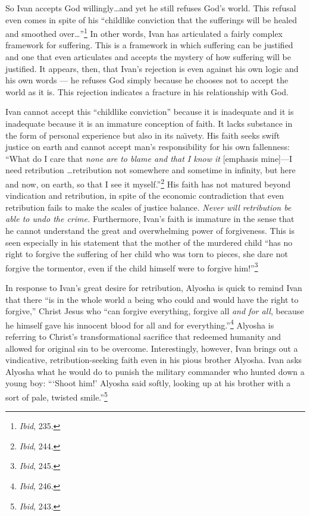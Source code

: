So Ivan accepts God willingly\ldots and yet he still refuses God's world. This refusal even comes in spite of his ``childlike conviction that the sufferings will be healed and smoothed over\ldots''\footnote{\emph{Ibid}, 235.} In other words, Ivan has articulated a fairly complex framework for suffering. This is a framework in which suffering can be justified and one that even articulates and accepts the mystery of how suffering will be justified. It appears, then, that Ivan's rejection is even against his own logic and his own words --- he refuses God simply because he chooses not to accept the world as it is. This rejection indicates a fracture in his relationship with God.

Ivan cannot accept this ``childlike conviction'' because it is inadequate and it is inadequate because it is an immature conception of faith. It lacks substance in the form of personal experience but also in its na\"{\i}vety. His faith seeks swift justice on earth and cannot accept man's responsibility for his own fallenness: ``What do I care that \emph{none are to blame and that I know it} [emphasis mine]---I need retribution \ldots retribution not somewhere and sometime in infinity, but here and now, on earth, so that I see it myself.''\footnote{\emph{Ibid}, 244.} His faith has not matured beyond vindication and retribution, in spite of the economic contradiction that even retribution fails to make the scales of justice balance. \emph{Never will retribution be able to undo the crime.} Furthermore, Ivan's faith is immature in the sense that he cannot understand the great and overwhelming power of forgiveness. This is seen especially in his statement that the mother of the murdered child ``has no right to forgive the suffering of her child who was torn to pieces, she dare not forgive the tormentor, even if the child himself were to forgive him!''\footnote{\emph{Ibid}, 245.}

In response to Ivan's great desire for retribution, Alyosha is quick to remind Ivan that there ``is in the whole world a being who could and would have the right to forgive,'' Christ Jesus who ``can forgive everything, forgive all \emph{and for all}, because he himself gave his innocent blood for all and for everything.''\footnote{\emph{Ibid}, 246.} Alyosha is referring to Christ's transformational sacrifice that redeemed humanity and allowed for original sin to be overcome. Interestingly, however, Ivan brings out a vindicative, retribution-seeking faith even in his pious brother Alyosha. Ivan asks Alyosha what he would do to punish the military commander who hunted down a young boy: ```Shoot him!' Alyosha said softly, looking up at his brother with a sort of pale, twisted smile.''\footnote{\emph{Ibid}, 243.} 

